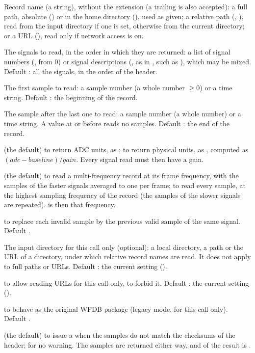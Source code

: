 \begin{params}
\item[record] Record name (a string), without the  extension (a trailing
   is also accepted): a full path, absolute () or in
  the home directory (), used as given; a relative
  path (, ), read from the input directory if one is set,
  otherwise from the current directory; or a URL
  (), read only if network access is
  on.
\item[channels] The signals to read, in the order in which they are returned: a list of
  signal numbers (, from 0) or signal descriptions (, as in
  , such as ), which may be mixed. Default :
  all the signals, in the order of the header.
\item[sampfrom] The first sample to read: a sample number (a whole number $\ge 0$) or a
  time string. Default : the beginning of the record.
\item[sampto] The sample after the last one to read: a sample number (a whole number) or
  a time string. A value at or before  reads no samples. Default
  : the end of the record.
\item[physical]  (the default) to return ADC units, as ;
   to return physical units, as , computed as
  $(\mathit{adc} - \mathit{baseline}) / \mathit{gain}$. Every signal read must then have a
  gain.
\item[highres]  (the default) to read a multi-frequency record at its frame
  frequency, with the samples of the faster signals averaged to one per frame;
   to read every sample, at the highest sampling frequency of the record (the
  samples of the slower signals are repeated).  is then that frequency.
\item[pad]  to replace each invalid sample by the previous valid sample of the
  same signal. Default .
\item[input\_dir] The input directory for this call only (optional): a local directory, a
  \code{\textasciitilde} path or the URL of a directory, under which relative record names
  are read. It does not apply to full paths or URLs. Default : the current
  setting ().
\item[network]  to allow reading URLs for this call only,  to forbid
  it. Default : the current setting ().
\item[legacy]  to behave as the original WFDB package (legacy mode, for this
  call only). Default .
\item[checksum\_warning]  (the default) to issue a  when
  the samples do not match the checksums of the header;  for no warning. The
  samples are returned either way, and  of the result is .
\end{params}
